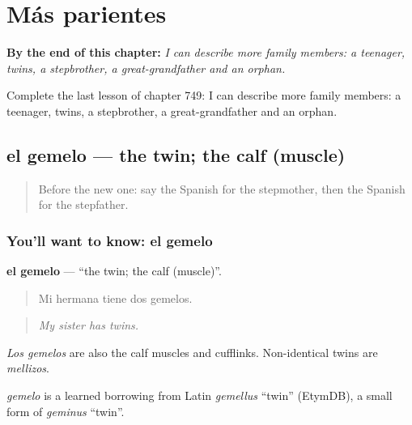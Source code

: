
\chapter{Más parientes}
\label{ch:es-mas-parientes}

\begin{chapteropening}
\textbf{By the end of this chapter:} \emph{I can describe more family members: a teenager, twins, a stepbrother, a great-grandfather and an orphan.}

Complete the last lesson of chapter 749: I can describe more family members: a teenager, twins, a stepbrother, a great-grandfather and an orphan.
\end{chapteropening}

\section[el gemelo]{el gemelo — the twin; the calf (muscle)}

\label{lesson:ES-C749-gemelo}



\begin{quote}
Before the new one: say the Spanish for the stepmother, then the Spanish for the stepfather.
\end{quote}

\subsection*{You'll want to know: el gemelo}
\textbf{el gemelo} — \textquotedblleft{}the twin; the calf (muscle)\textquotedblright{}.

\begin{quote}
Mi hermana tiene dos gemelos.
\end{quote}

\begin{quote}
\emph{My sister has twins.}
\end{quote}

\emph{Los gemelos} are also the calf muscles and cufflinks. Non-identical twins are \emph{mellizos}.

\begin{cousinweb}
\emph{gemelo} is a learned borrowing from Latin \emph{gemellus} \textquotedblleft{}twin\textquotedblright{} (EtymDB), a small form of \emph{geminus} \textquotedblleft{}twin\textquotedblright{}.
\end{cousinweb}

